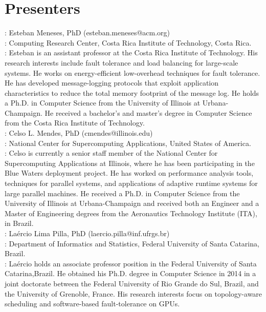 \documentclass[letterpaper,10pt]{article}
\begin{document}
\section{Presenters}

: Esteban Meneses, PhD (esteban.meneses@acm.org)\\
: Computing Research Center, Costa Rica Institute of Technology, Costa Rica.\\
: Esteban is an assistant professor at the Costa Rica Institute of Technology. His research interests include fault tolerance and load balancing for large-scale systems. He works on energy-efficient low-overhead techniques for fault tolerance. He has developed message-logging protocols that exploit application characteristics to reduce the total memory footprint of the message log. He holds a Ph.D. in Computer Science from the University of Illinois at Urbana-Champaign.
He received a bachelor's and master's degree in Computer Science from the Costa
Rica Institute of Technology. \\

: Celso L. Mendes, PhD (cmendes@illinois.edu)\\
: National Center for Supercomputing Applications, United States of America.\\
: Celso is currently a senior staff member of the National
Center for Supercomputing Applications at Illinois, where he has been
participating in the Blue Waters deployment project. 
He has worked on performance analysis tools, techniques for parallel systems, and applications of adaptive runtime systems
for large parallel machines.
He received a Ph.D. in Computer Science from the University of Illinois
at Urbana-Champaign and received both an Engineer and a Master of Engineering
degrees from the Aeronautics Technology Institute (ITA), in Brazil.\\

: La\'{e}rcio Lima Pilla, PhD (laercio.pilla@inf.ufrgs.br)\\
: Department of Informatics and Statistics, Federal University of Santa Catarina, Brazil.\\
: La\'{e}rcio holds an associate professor position in the Federal University of Santa Catarina,Brazil. He obtained his Ph.D. degree in Computer Science in 2014 in a joint doctorate
between the Federal University of Rio Grande do Sul, Brazil, and the University of Grenoble, France. His research interests focus on topology-aware scheduling and software-based fault-tolerance on GPUs.\\
\end{document}
